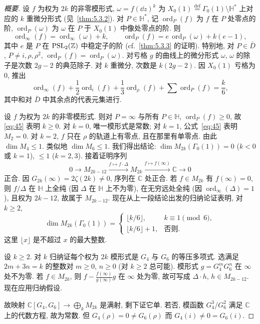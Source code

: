 \begin{proof}[概要]
设 $f$ 为权为 $2k$ 的非零模形式, $\omega = f(\dd z)^k$ 为 $X_0(1) \overset{\text{def}}{=} \Gamma_0(1)\setminus\mathbb{H}^*$ 上对应的 $k$ 重微分形式 (见~\ref{thm:5.3.2}). 对 $P\in\mathbb{H}^*$, 记 $\operatorname{ord}_P(f)$ 为 $f$ 在 $P$ 处零点的阶, $\operatorname{ord}_P(\omega)$ 为 $\omega$ 在 $P$ 于 $X_0(1)$ 中像处零点的阶. 则
\[
\operatorname{ord}_\infty(f) = \operatorname{ord}_\infty(\omega) + k, \qquad
\operatorname{ord}_P(f) = e\,\operatorname{ord}_P(\omega) + k(e-1),
\]
其中 $e$ 是 $P$ 在 $\operatorname{PSL}_2(\mathbb{Z})$ 中稳定子的阶 (cf.\ \ref{thm:5.3.3} 的证明). 特别地, 对 $P\in\bar{D}$, $P\neq i, \rho, \rho^2$, $\operatorname{ord}_P(f) = \operatorname{ord}_P(\omega)$. 对亏格 $g$ 的曲线上的微分形式 $\omega$, $\omega$ 的除子是次数 $2g-2$ 的典范除子. 对 $k$ 重微分, 次数是 $k(2g-2)$. 因 $X_0(1)$ 亏格为 $0$, 推出
\begin{equation} \label{eq:45}
\operatorname{ord}_\infty(f) + \frac{1}{2}\operatorname{ord}_i(f) + \frac{1}{3}\operatorname{ord}_\rho(f) + \sum\operatorname{ord}_P(f) = \frac{k}{6},
\tag{45}
\end{equation}
其中和对 $\bar{D}$ 中其余点的代表元集进行.

设 $f$ 为权为 $2k$ 的非零模形式. 则对 $P = \infty$ 与所有 $P\in\mathbb{H}$, $\operatorname{ord}_P(f)\ge 0$, 故 \eqref{eq:45} 表明 $k\ge 0$. 对 $k = 0$, 唯一模形式是常数; 对 $k = 1$, 公式~\eqref{eq:45} 表明 $M_2 = 0$. 对 $k = 2$, $f$ 只在 $\rho$ 的轨道上有零点, 且在那里有单零点. 由此 $\dim M_4\le 1$. 类似地 $\dim M_6\le 1$. 我们得出结论: $\dim M_{2k}(\Gamma_0(1)) = 0$ ($k < 0$ 或 $k = 1$), $\le 1$ ($k = 2, 3$). 接着证明序列
\[
0\to M_{2k-12}\xrightarrow{f\mapsto f\cdot\Delta}M_{2k}\xrightarrow{f\mapsto f(\infty)}\mathbb{C}\longrightarrow 0
\]
正合. 因 $G_{2k}(\infty) = 2\zeta(2k)\neq 0$, 序列在 $\mathbb{C}$ 处正合. 若 $f\in M_{2k}$ 有 $f(\infty) = 0$, 则 $f/\Delta$ 在 $\mathbb{H}$ 上全纯 (因 $\Delta$ 在 $\mathbb{H}$ 上不为零), 在无穷远处全纯 (因 $\operatorname{ord}_\infty(\Delta) = 1$), 且权为 $2k-12$, 故属于 $M_{2k-12}$. 现在从上一段结论出发的归纳论证表明, 对 $k\ge 2$,
\[
\dim M_{2k}(\Gamma_0(1)) = \begin{cases} \lfloor k/6\rfloor, & k\equiv 1\pmod{6},\\ \lfloor k/6\rfloor + 1, & \text{否则}. \end{cases}
\]
这里 $\lfloor x\rfloor$ 是不超过 $x$ 的最大整数.

设 $k\ge 2$. 对 $k$ 归纳证每个权为 $2k$ 模形式是 $G_4$ 与 $G_6$ 的等压多项式. 选满足 $2m + 3n = k$ 的整数对 $m\ge 0$, $n\ge 0$ (对 $k\ge 2$ 总可能). 模形式 $g = G_4^mG_6^n$ 在 $\infty$ 处不为零. 若 $f\in M_{2k}$, 则 $f - \frac{f(\infty)}{g(\infty)}g$ 在 $\infty$ 处为零, 故可写成 $\Delta\cdot h$, $h\in M_{2k-12}$. 现在应用归纳假设.

故映射 $\mathbb{C}[G_4, G_6]\to\bigoplus_k M_{2k}$ 是满射, 剩下证它单. 若否, 模函数 $G_4^3/G_6^2$ 满足 $\mathbb{C}$ 上的代数方程, 故为常数. 但 $G_4(\rho) = 0\neq G_6(\rho)$ 而 $G_4(i)\neq 0 = G_6(i)$.
\end{proof}

